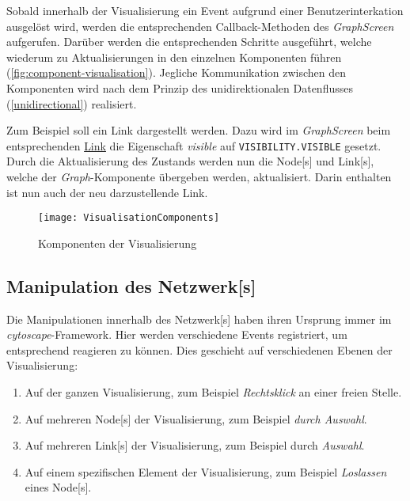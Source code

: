 Sobald innerhalb der Visualisierung ein \gls{Event} aufgrund einer Benutzerinterkation ausgelöst wird, werden die entsprechenden \gls{Callback}-Methoden des \textit{GraphScreen} aufgerufen. Darüber werden die entsprechenden Schritte ausgeführt, welche wiederum zu Aktualisierungen in den einzelnen Komponenten führen (\autoref{fig:component-visualisation}). Jegliche Kommunikation zwischen den Komponenten wird nach dem Prinzip des unidirektionalen Datenflusses (\autoref{unidirectional}) realisiert.

Zum Beispiel soll ein \gls{Link} dargestellt werden. Dazu wird im \textit{GraphScreen} beim entsprechenden \hyperref[GraphLinkElement]{Link} die Eigenschaft \textit{visible} auf \texttt{VISI\-BILI\-TY.VISI\-BLE} gesetzt. Durch die Aktualisierung des Zustands werden nun die \gls{Node}[s] und \gls{Link}[s], welche der \textit{Graph}-Komponente übergeben werden, aktualisiert. Darin enthalten ist nun auch der neu darzustellende Link.

\begin{figure}[htbp]
\centerline{\texttt{[image: VisualisationComponents]}}
\caption{Komponenten der Visualisierung}
\label{fig:component-visualisation}
\end{figure}


\subsection{Manipulation des \gls{Netzwerk}[s]}
\label{subsec:graph-manipulation}

Die Manipulationen innerhalb des \gls{Netzwerk}[s] haben ihren Ursprung immer im \textit{cytoscape}-Framework. Hier werden verschiedene \gls{Event}s registriert, um entsprechend reagieren zu können. Dies geschieht auf verschiedenen Ebenen der Visualisierung:
\begin{enumerate}
    \item Auf der ganzen Visualisierung, zum Beispiel \textit{Rechtsklick} an einer freien Stelle.
    \item Auf mehreren \gls{Node}[s] der Visualisierung, zum Beispiel \textit{durch Auswahl}.
    \item Auf mehreren \gls{Link}[s] der Visualisierung, zum Beispiel durch \textit{Auswahl}.
    \item Auf einem spezifischen Element der Visualisierung, zum Beispiel \textit{Loslassen} eines \gls{Node}[s].
\end{enumerate}




